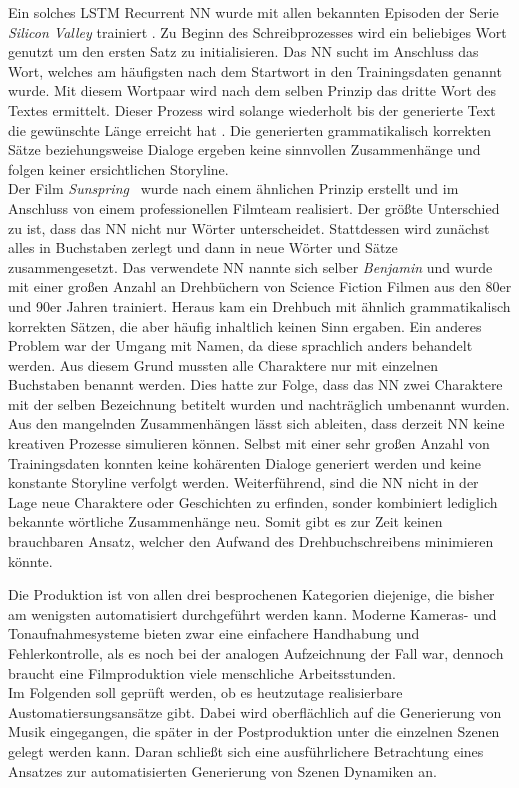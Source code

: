 \documentclass[times, 11pt,twocolumn]{article}
\begin{document}
 \label{sec:SOTAVorverarbeitung}
Ein solches LSTM Recurrent NN wurde mit allen bekannten Episoden der Serie \textit{Silicon Valley} trainiert \cite{DrehbuchSV}. Zu Beginn des Schreibprozesses wird ein beliebiges Wort genutzt um den ersten Satz zu initialisieren. Das NN sucht im Anschluss das Wort, welches am häufigsten nach dem Startwort in den Trainingsdaten genannt wurde. Mit diesem Wortpaar wird nach dem selben Prinzip das dritte Wort des Textes ermittelt. Dieser Prozess wird solange wiederholt bis der generierte Text die gewünschte Länge erreicht hat \cite{DrehbuchWrite}. Die generierten  grammatikalisch korrekten Sätze beziehungsweise Dialoge ergeben keine sinnvollen Zusammenhänge und folgen keiner ersichtlichen Storyline. \\

Der Film \textit{Sunspring}~\cite{DrehbuchMovie} wurde nach einem ähnlichen Prinzip erstellt und im Anschluss von einem professionellen Filmteam realisiert. Der größte Unterschied zu \cite{DrehbuchSV} ist, dass das NN nicht nur Wörter unterscheidet. Stattdessen wird zunächst alles in Buchstaben zerlegt und dann in neue Wörter und Sätze zusammengesetzt. Das verwendete NN nannte sich selber \textit{Benjamin} und wurde mit einer großen Anzahl an Drehbüchern von Science Fiction Filmen aus den 80er und 90er Jahren trainiert. Heraus kam ein Drehbuch mit ähnlich  grammatikalisch korrekten Sätzen, die aber häufig inhaltlich keinen Sinn ergaben. Ein anderes Problem war der Umgang mit Namen, da diese sprachlich anders behandelt werden. Aus diesem Grund mussten alle Charaktere nur mit einzelnen Buchstaben benannt werden. Dies hatte zur Folge, dass das NN zwei Charaktere mit der selben Bezeichnung betitelt wurden und nachträglich umbenannt wurden.\\

Aus den mangelnden Zusammenhängen lässt sich ableiten, dass derzeit NN keine kreativen Prozesse simulieren können. Selbst mit einer sehr großen Anzahl von Trainingsdaten konnten keine kohärenten Dialoge generiert werden und keine konstante Storyline verfolgt werden. Weiterführend, sind die NN nicht in der Lage neue Charaktere oder Geschichten zu erfinden, sonder kombiniert lediglich bekannte wörtliche Zusammenhänge neu. Somit gibt es zur Zeit keinen brauchbaren Ansatz, welcher den Aufwand des Drehbuchschreibens minimieren könnte. 

 \label{sec:Produktion}
Die Produktion ist von allen drei besprochenen Kategorien diejenige, die bisher am wenigsten automatisiert durchgeführt werden kann. Moderne Kameras- und Tonaufnahmesysteme bieten zwar eine einfachere Handhabung und Fehlerkontrolle, als es noch bei der analogen Aufzeichnung der Fall war, dennoch braucht eine Filmproduktion viele menschliche Arbeitsstunden. \\
Im Folgenden soll geprüft werden, ob es heutzutage realisierbare Austomatiersungsansätze gibt. Dabei wird oberflächlich auf die Generierung von Musik eingegangen, die später in der Postproduktion unter die einzelnen Szenen gelegt werden kann. Daran schließt sich eine ausführlichere Betrachtung eines Ansatzes zur automatisierten Generierung von Szenen Dynamiken an. 
\end{document}
